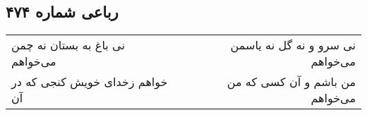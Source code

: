 \begin{center}
\section*{رباعی شماره ۴۷۴}
\label{sec:sh474}
\begin{longtable}{l p{0.5cm} r}
نی باغ به بستان نه چمن می‌خواهم
&&
نی سرو و نه گل نه یاسمن می‌خواهم
\\
خواهم زخدای خویش کنجی که در آن
&&
من باشم و آن کسی که من می‌خواهم
\\
\end{longtable}
\end{center}
